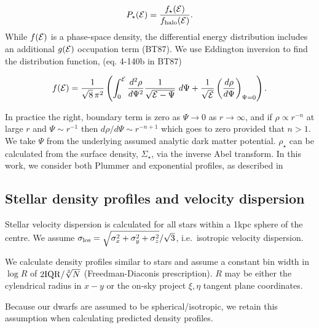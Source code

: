 \begin{equation}{
P_\star({\cal E}) = \frac{f_\star({\cal E})}{f_{\rm halo}({\cal E})}.
}\end{equation} While \(f({\cal E})\) is a phase-space density, the
differential energy distribution includes an additional \(g({\cal E})\)
occupation term (BT87). We use Eddington inversion to find the
distribution function, (eq. 4-140b in BT87)

\begin{equation}{
f({\cal E}) = \frac{1}{\sqrt{8}\, \pi^2}\left( \int_0^{\cal E} \frac{d^2\rho}{d\Psi^2} \frac{1}{\sqrt{{\cal E} - \Psi}}\ d\Psi + \frac{1}{\sqrt{\cal E}} \left(\frac{d\rho}{d\Psi}\right)_{\Psi=0} \right).
}\end{equation}

In practice the right, boundary term is zero as \(\Psi \to 0\) as
\(r\to\infty\), and if \(\rho \propto r^{-n}\) at large \(r\) and
\(\Psi \sim r^{-1}\) then \(d\rho / d\Psi \sim r^{-n+1}\) which goes to
zero provided that \(n > 1\). We take \(\Psi\) from the underlying
assumed analytic dark matter potential. \(\rho_\star\) can be calculated
from the surface density, \(\Sigma_\star\), via the inverse Abel
transform. In this work, we consider both Plummer and exponential
profiles, as described in

\subsection{Stellar density profiles and velocity
dispersion}\label{stellar-density-profiles-and-velocity-dispersion}

Stellar velocity dispersion is calculated for all stars within a 1kpc
sphere of the centre. We assume
\(\sigma_{\rm los} = \sqrt{\sigma_x^2 + \sigma_y^2 + \sigma_z^2}/ \sqrt 3\),
i.e.~isotropic velocity dispersion.

We calculate density profiles similar to stars and assume a constant bin
width in \(\log R\) of \(2 {\rm IQR} / \sqrt[3]{N}\) (Freedman-Diaconis
prescription). \(R\) may be either the cylendrical radius in \(x-y\) or
the on-sky project \(\xi, \eta\) tangent plane coordinates.

Because our dwarfs are assumed to be spherical/isotropic, we retain this
assumption when calculating predicted density profiles.
